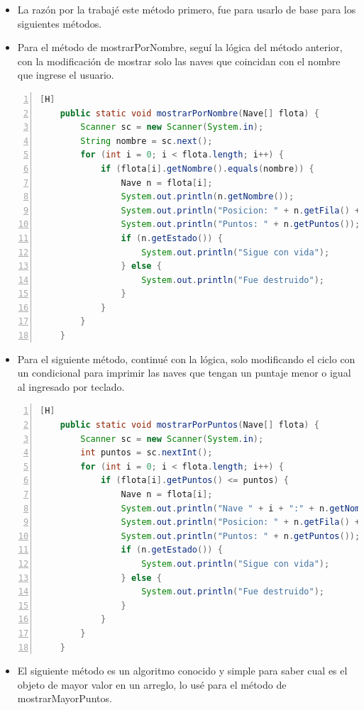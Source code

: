\documentclass{article}
\begin{document}
	\begin{itemize}	
		\item La razón por la trabajé este método primero, fue para usarlo de base para los siguientes métodos.
		\item Para el método de mostrarPorNombre, seguí la lógica del método anterior, con la modificación de mostrar solo las naves que coincidan con el nombre que ingrese el usuario.
	\end{itemize}
	\begin{lstlisting}[language=java,caption={Mostrar por Nombre}, numbers=left][H]
	public static void mostrarPorNombre(Nave[] flota) {
        Scanner sc = new Scanner(System.in);
        String nombre = sc.next();
        for (int i = 0; i < flota.length; i++) {
            if (flota[i].getNombre().equals(nombre)) {
                Nave n = flota[i];
                System.out.println(n.getNombre());
                System.out.println("Posicion: " + n.getFila() + n.getColumna());
                System.out.println("Puntos: " + n.getPuntos());
                if (n.getEstado()) {
                    System.out.println("Sigue con vida");
                } else {
                    System.out.println("Fue destruido");
                }
            }
        }
    }
	\end{lstlisting}
	\begin{itemize}	
		\item Para el siguiente método, continué con la lógica, solo modificando el ciclo con un condicional para imprimir las naves que tengan un puntaje menor o igual al ingresado por teclado.
	\end{itemize}
	\begin{lstlisting}[language=java,caption={Mostrando por puntos menores o iguales}, numbers=left][H]
	public static void mostrarPorPuntos(Nave[] flota) {
        Scanner sc = new Scanner(System.in);
        int puntos = sc.nextInt();
        for (int i = 0; i < flota.length; i++) {
            if (flota[i].getPuntos() <= puntos) {
                Nave n = flota[i];
                System.out.println("Nave " + i + ":" + n.getNombre());
                System.out.println("Posicion: " + n.getFila() + n.getColumna());
                System.out.println("Puntos: " + n.getPuntos());
                if (n.getEstado()) {
                    System.out.println("Sigue con vida");
                } else {
                    System.out.println("Fue destruido");
                }
            }
        }
    }
	\end{lstlisting}
	\begin{itemize}	
		\item El siguiente método es un algoritmo conocido y simple para saber cual es el objeto de mayor valor en un arreglo, lo usé para el método de mostrarMayorPuntos.
	\end{itemize}
\end{document}
